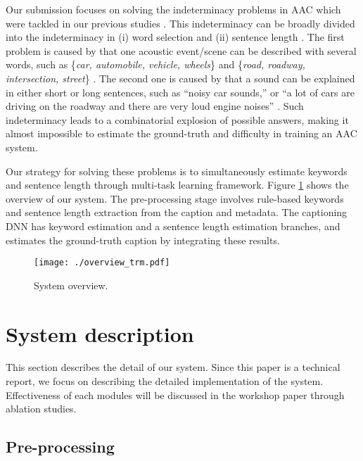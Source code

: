 \documentclass{article}
\begin{document}
\begin{sloppy}
Our submission focuses on solving the indeterminacy problems in AAC which were tackled in our previous studies \cite{ac2,tracke}. This indeterminacy can be broadly divided into the indeterminacy in (i) word selection \cite{tracke} and (ii) sentence length \cite{ac2}. The first problem is caused by that one acoustic event/scene can be described with several words, such as \{{\it car, automobile, vehicle, wheels}\} and \{{\it road, roadway, intersection, street}\} \cite{tracke}. The second one is caused by that a sound can be explained in either short or long sentences, such as ``noisy car sounds,'' or ``a lot of cars are driving on the roadway and there are very loud engine noises'' \cite{tracke}. Such indeterminacy leads to a combinatorial explosion of possible answers, making it almost impossible to estimate the ground-truth and difficulty in training an AAC system.

Our strategy for solving these problems is to simultaneously estimate keywords and sentence length through multi-task learning framework. Figure \ref{fig:sysov} shows the overview of our system. The pre-processing stage involves rule-based keywords and sentence length extraction from the caption and metadata. The captioning DNN has keyword estimation and a sentence length estimation branches, and estimates the ground-truth caption by integrating these results. 


\begin{figure}[t]
  \centering
\texttt{[image: ./overview\_trm.pdf]} 
  \vspace{-15pt}
  \caption{System overview.}
  \label{fig:sysov}
  \vspace{-10pt}
\end{figure}




\section{System description}

This section describes the detail of our system. Since this paper is a technical report, we focus on describing the detailed implementation of the system. Effectiveness of each modules will be discussed in the workshop paper through ablation studies.

\subsection{Pre-processing}


\end{sloppy}
\end{document}
